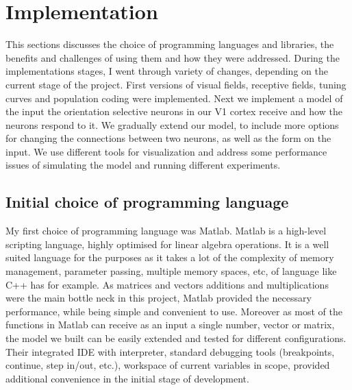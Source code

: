 \chapter{Implementation}

This sections discusses the choice of programming languages and libraries, the benefits and challenges of using them and how they were addressed. During the implementations stages, I went through variety of changes, depending on the current stage of the project. First versions of visual fields, receptive fields, tuning curves and population coding were implemented. Next we implement a model of the input the orientation selective neurons in our V1 cortex receive and how the neurons respond to it. We gradually extend our model, to include more options for changing the connections between two neurons, as well as the form on the input. We use different tools for visualization and address some performance issues of simulating the model and running different experiments.


\section{Initial choice of programming language}
My first choice of programming language was Matlab. Matlab is a high-level scripting language, highly optimised for linear algebra operations. It is a well suited language for the purposes as it takes a lot of the complexity of memory management, parameter passing, multiple memory spaces, etc, of language like C++ has for example. As matrices and vectors additions and multiplications were the main bottle neck in this project, Matlab provided the necessary performance, while being simple and convenient to use. Moreover as most of the functions in Matlab can receive as an input a single number, vector or matrix, the model we built can be easily extended and tested for different configurations. Their integrated IDE with interpreter, standard debugging tools (breakpoints, continue, step in/out, etc.), workspace of current variables in scope, provided additional convenience in the initial stage of development.

